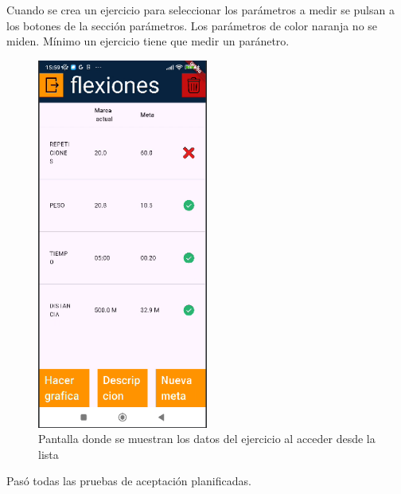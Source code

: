 Cuando se crea un ejercicio para seleccionar los parámetros a medir se pulsan a los botones de la sección parámetros. Los parámetros de color naranja no se miden. Mínimo un ejercicio tiene que medir un paránetro.

\begin{figure}[H]
   \centering
    \includegraphics[width=0.5\textwidth]{pantallas/datosEjercicio.png}
    \caption{Pantalla donde se muestran los datos del ejercicio al acceder desde la lista}
    \label{fig:datosEjer}
\end{figure}

Pasó todas las pruebas de aceptación planificadas.


